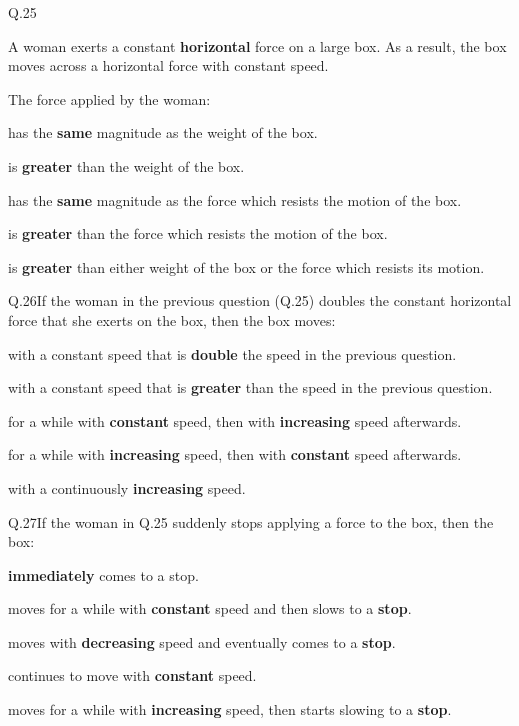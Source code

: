     \begin{mcq}{Q.25}{A woman exerts a constant \textbf{horizontal} force on a large box. As a result, the box moves across a horizontal force with constant speed.
   
        \eline[]
        The force applied by the woman:
    }
        \item has the \textbf{same} magnitude as the weight of the box.
        \item is \textbf{greater} than the weight of the box.
        \item has the \textbf{same} magnitude as the force which resists the motion of the box.
        \item is \textbf{greater} than the force which resists the motion of the box.
        \item is \textbf{greater} than either weight of the box or the force which resists its motion.
    \end{mcq}

    \begin{mcq}{Q.26}{If the woman in the previous question (Q.25) doubles the constant horizontal force that she exerts on the box, then the box moves:}
        \item with a constant speed that is \textbf{double} the speed in the previous question.
        \item with a constant speed that is \textbf{greater} than the speed in the previous question.
        \item for a while with \textbf{constant} speed, then with \textbf{increasing} speed afterwards.
        \item for a while with \textbf{increasing} speed, then with \textbf{constant} speed afterwards.
        \item with a continuously \textbf{increasing} speed.
    \end{mcq}

    \begin{mcq}{Q.27}{If the woman in Q.25 suddenly stops applying a force to the box, then the box:}
        \item \textbf{immediately} comes to a stop.
        \item moves for a while with \textbf{constant} speed and then slows to a \textbf{stop}.
        \item moves with \textbf{decreasing} speed and eventually comes to a \textbf{stop}.
        \item continues to move with \textbf{constant} speed.
        \item moves for a while with \textbf{increasing} speed, then starts slowing to a \textbf{stop}.
    \end{mcq}

